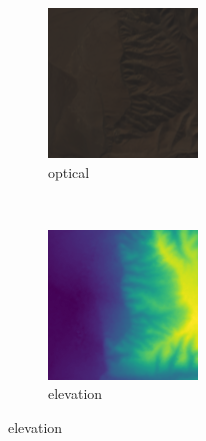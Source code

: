 \documentclass[11pt,a4paper]{article}
\begin{document}
\begin{figure}[t]
    \centering
    \begin{subfigure}[b]{0.25\textwidth}
        \includegraphics[width=\textwidth]{graphics/nn_visualisation/input_image_0_2.png}
        \caption{optical}
        \label{fig:nn_vis_conv_filters_inp_1}
    \end{subfigure}
    ~
    \begin{subfigure}[b]{0.25\textwidth}
        \includegraphics[width=\textwidth]{graphics/nn_visualisation/input_image_3.png}
        \caption{elevation}
        \label{fig:nn_vis_conv_filters_inp_2}
    \end{subfigure}


\end{figure}
\end{document}

